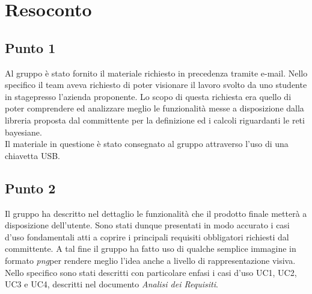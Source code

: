 \section{Resoconto}

\subsection{Punto 1}
Al gruppo è stato fornito il materiale richiesto in precedenza tramite e-mail.
Nello specifico il team aveva richiesto di poter visionare il lavoro svolto da uno studente in stage\glossario presso l'azienda proponente. Lo scopo di questa richiesta era quello di poter comprendere ed analizzare meglio le funzionalità messe a disposizione dalla libreria proposta dal committente per la definizione ed i calcoli riguardanti le reti bayesiane.\\
Il materiale in questione è stato consegnato al gruppo attraverso l'uso di una chiavetta USB.

\subsection{Punto 2}
Il gruppo ha descritto nel dettaglio le funzionalità che il prodotto finale metterà a disposizione dell'utente. Sono stati dunque presentati in modo accurato i casi d'uso fondamentali atti a coprire i principali requisiti obbligatori richiesti dal committente. A tal fine il gruppo ha fatto uso di qualche semplice immagine in formato \textit{png}\glossario per rendere meglio l'idea anche a livello di rappresentazione visiva.\\
Nello specifico sono stati descritti con particolare enfasi i casi d'uso UC1, UC2, UC3 e UC4, descritti nel documento \textit{Analisi dei Requisiti}.

